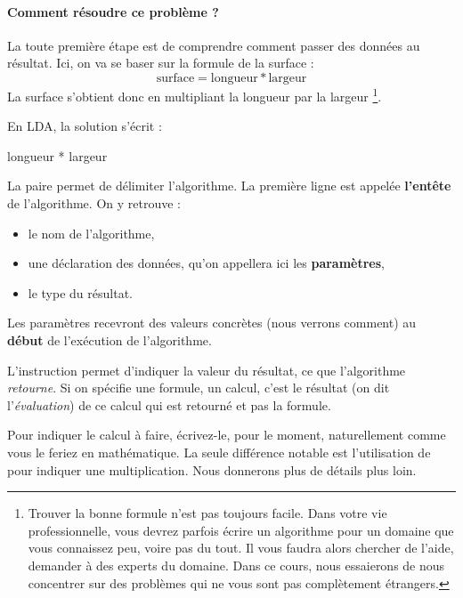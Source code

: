 			\paragraph{Comment résoudre ce problème ?} 
			La toute première étape est de comprendre comment passer des données
			au résultat. Ici, on va se baser sur la formule de la surface :
			\[
				\textrm{surface} = \textrm{longueur} * \textrm{largeur}
			\]
			La surface s'obtient donc en multipliant la longueur par la largeur%
			\footnote{%
				Trouver la bonne formule n'est pas toujours facile.
				Dans votre vie professionnelle, 
				vous devrez parfois écrire un algorithme
				pour un domaine que vous connaissez peu,
				voire pas du tout.
				Il vous faudra alors chercher de l'aide,
				demander à des experts du domaine.
				Dans ce cours,
				nous essaierons de nous concentrer sur des problèmes
				qui ne vous sont pas complètement étrangers.
			}.
			
			En LDA, la solution s'écrit :
			
			\begin{LDA}
					\Return longueur * largeur
				\EndAlgo
			\end{LDA}
		
			La paire \lda{\algorithmicalgo-\algorithmicend\ \algorithmicalgo}
			permet de délimiter l'algorithme.
			La première ligne est appelée 
			\textbf{l'entête} de l'algorithme.
			On y retrouve :
			\begin{itemize}
				\item 
					le nom de l'algorithme,
				\item 
					une déclaration des données, 
					qu’on appellera ici les \textbf{paramètres}, 
				\item 
					le type du résultat.
			\end{itemize}
		
			Les paramètres recevront des valeurs concrètes
			(nous verrons comment)
			au \textbf{début} de l’exécution de l'algorithme. 
		
			L'instruction \lda{\algorithmicreturn}
			permet d'indiquer la valeur du résultat, 
			ce que l'algorithme \emph{retourne}.
			Si on spécifie une formule, un calcul,
			c'est le résultat (on dit l'\emph{évaluation}) 
			de ce calcul qui est retourné et pas la formule.
		
			Pour indiquer le calcul à faire,
			écrivez-le, pour le moment,
			naturellement comme vous le feriez en mathématique.
			La seule différence notable est l'utilisation de \lda{*}
			pour indiquer une multiplication.
			Nous donnerons plus de détails plus loin.
	
